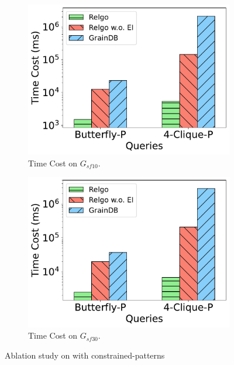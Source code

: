 \begin{figure}[ht]
    \centering
    \begin{subfigure}[b]{.45\linewidth}
        \centering
        \includegraphics[width=\linewidth]{./figures/exp/ablation_ei_para_sf10.pdf}
        \caption{Time Cost on $G_{sf10}$.}
        \label{fig:exp-expand-intersect-sf10}
    \end{subfigure}
    \begin{subfigure}[b]{0.45\linewidth}
        \centering
        \includegraphics[width=\linewidth]{./figures/exp/ablation_ei_para_sf30.pdf}
        \caption{Time Cost on $G_{sf30}$.}
        \label{fig:exp-expand-intersect-sf30}
    \end{subfigure}
    \caption{Ablation study on \expandintersectrule with constrained-patterns}
    \label{fig:exp-expand-intersect}
\end{figure}

